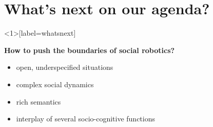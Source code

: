 \documentclass[compress]{beamer}
\begin{document}

\section{What's next on our agenda?}

\begin{frame}<1>[label=whatsnext]{}

    \begin{center}

    \Large
    \bf How to push the boundaries of social robotics?

    \end{center}

    \begin{itemize}
        \item open, underspecified situations
        \item complex social dynamics
        \item rich semantics
        \item interplay of several socio-cognitive functions
    \end{itemize}

\end{frame}
\end{document}
